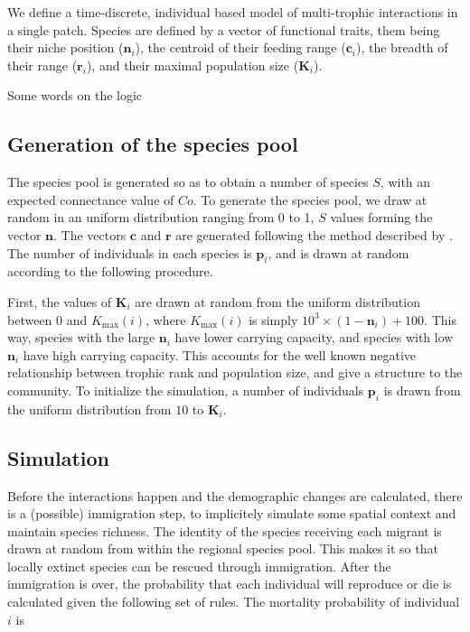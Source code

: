 \documentclass[10pt,twocolumn,fleqn]{article}
\begin{document}
We define a time-discrete, individual based model of multi-trophic interactions in a single
patch. Species are defined by a vector of functional traits, them being their
niche position ($\mathbf{n}_i$), the centroid of their feeding range
($\mathbf{c}_i$), the breadth of their range ($\mathbf{r}_i$), and their
maximal population size ($\mathbf{K}_i$).

Some words on the logic

\subsection{Generation of the species pool}

The species pool is generated so as to obtain a number of species $S$, with an
expected connectance value of $Co$. To generate the species pool, we draw at
random in an uniform distribution ranging from 0 to 1, $S$ values forming the
vector $\mathbf{n}$. The vectors $\mathbf{c}$ and $\mathbf{r}$ are generated
following the method described by \textcite{williams_simple_2000}. The number of
individuals in each species is $\mathbf{p}_i$, and is drawn at random according
to the following procedure.

First, the values of $\mathbf{K}_i$ are drawn at random from the
uniform distribution between 0 and $K_{\mathrm{max}}(i)$, where
$K_{\mathrm{max}}(i)$ is simply $10^3\times(1-\mathbf{n}_i)+100$. This way,
species with the large $\mathbf{n}_i$ have lower carrying capacity, and
species with low $\mathbf{n}_i$ have high carrying capacity. This accounts for
the well known negative relationship between trophic rank and population size,
and give a structure to the community.
To initialize the simulation, a number of individuals $\mathbf{p}_i$ is drawn
from the uniform distribution from $10$ to $\mathbf{K}_i$.

\subsection{Simulation}

Before the interactions happen and the demographic changes are calculated,
there is a (possible) immigration step, to implicitely simulate some spatial
context and maintain species richness. The identity of the species receiving
each migrant is drawn at random from within the regional species pool. This
makes it so that locally extinct species can be rescued through immigration.
After the immigration is over, the probability that each individual will
reproduce or die is calculated given the following set of rules. The mortality
probability of individual $i$ is
\end{document}
